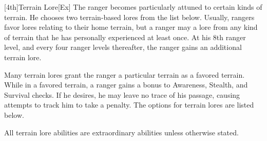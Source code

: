         [4th]{Terrain Lore}[Ex]
        The ranger becomes particularly attuned to certain kinds of terrain.
        He chooses two terrain-based lores from the list below.
        Usually, rangers favor lores relating to their home terrain, but a ranger may a lore from any kind of terrain that he has personally experienced at least once.
        At his 8th ranger level, and every four ranger levels thereafter, the ranger gains an additional terrain lore.

        Many terrain lores grant the ranger a particular terrain as a favored terrain.
        While in a favored terrain, a ranger gains a  bonus to Awareness, Stealth, and Survival checks.
        If he desires, he may leave no trace of his passage, causing attempts to track him to take a  penalty.
        The options for terrain lores are listed below.

        All terrain lore abilities are extraordinary abilities unless otherwise stated.

